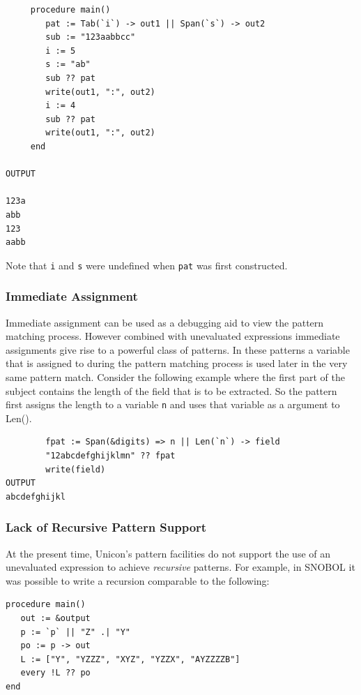 \documentclass[letterpaper,12pt]{article}
\begin{document}
\begin{verbatim}
     procedure main()
        pat := Tab(`i`) -> out1 || Span(`s`) -> out2
        sub := "123aabbcc"
        i := 5
        s := "ab"
        sub ?? pat
        write(out1, ":", out2)
        i := 4
        sub ?? pat
        write(out1, ":", out2)
     end

OUTPUT

123a
abb
123
aabb
\end{verbatim}

\noindent Note that \texttt{i} and \texttt{s} were undefined when \texttt{pat}
was first constructed.

\subsubsection{Immediate Assignment}

Immediate assignment can be used as a debugging aid to view the
pattern matching process. However combined with unevaluated
expressions immediate assignments give rise to a powerful class of
patterns. In these patterns a variable that is assigned to during the
pattern matching process is used later in the very same pattern match.
Consider the following example where the first part of the subject
contains the length of the field that is to be extracted. So the
pattern first assigns the length to a variable \texttt{n} and uses
that variable as a argument to Len().

\begin{verbatim}
        fpat := Span(&digits) => n || Len(`n`) -> field        
        "12abcdefghijklmn" ?? fpat
        write(field)
OUTPUT
abcdefghijkl
\end{verbatim}

\subsubsection{Lack of Recursive Pattern Support}

At the present time, Unicon's pattern facilities do not support
the use of an unevaluated expression to achieve {\em recursive}
patterns.  For example, in SNOBOL it was possible to write a
recursion comparable to the following:

\begin{verbatim}
procedure main()
   out := &output
   p := `p` || "Z" .| "Y"
   po := p -> out
   L := ["Y", "YZZZ", "XYZ", "YZZX", "AYZZZZB"]
   every !L ?? po
end
\end{verbatim}
\end{document}
